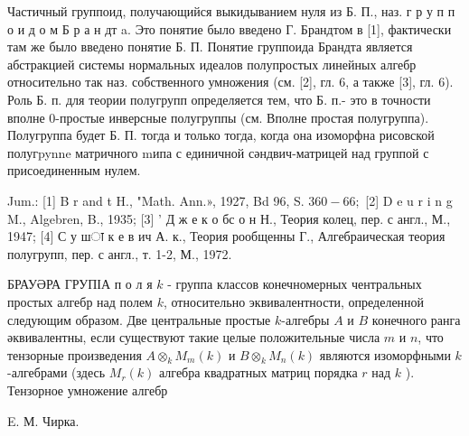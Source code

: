 \documentclass[10pt]{article}
\begin{document}
Частичный группоид, получающийся выкидыванием нуля из Б. П., наз. г р у п п о и д о м Б р а н дт a. Это понятие было введено Г. Брандтом в [1], фактически там же было введено понятие Б. П. Понятие группоида Брандта является абстракцией системы нормальных идеалов полупростых линейных алгебр относительно так наз. собственного умножения (см. [2], гл. 6, а также [3], гл. 6). Роль Б. п. для теории полугрупп определяется тем, что Б. п.- это в точности вполне 0-простые инверсные полугруппы (см. Вполне простая полугруппа). Полугруппа будет Б. П. тогда и только тогда, когда она изоморфна рисовской полугpynne матричного mипа с единичной сәндвич-матрицей над группой с присоединенным нулем.



Jum.: [1] B r and t H., "Math. Ann.», 1927, Bd 96, S. $360-66 ;$ [2] D e u r i n g M., Algebren, B., 1935; [3] ' Д ж е к о бс о н Н., Теория колец, пер. с англ., М., 1947; [4] С у шा к е в ич А. к., Теория рообщенны Г., Алгебраическая теория полугрупп, пер. с англ., т. 1-2, М., 1972.



БРАУӘРА ГРУПІА п о л я $k$ - группа классов конечномерных чентральных простых алгебр над полем $k$, относительно эквивалентности, определенной следующим образом. Две центральные простые $k$-алгебры $A$ и $B$ конечного ранга әквивалентны, если существуют такие целые положительные числа $m$ и $n$, что тензорные произведения $A \otimes_{k} M_{m}(k)$ и $B \otimes_{k} M_{n}(k)$ являются изоморфными $k$-алгебрами (здесь $M_{r}(k)$ алгебра квадратных матриц порядка $r$ над $k$ ). Тензорное умножение алгебр



E. М. Чирка.
\end{document}
